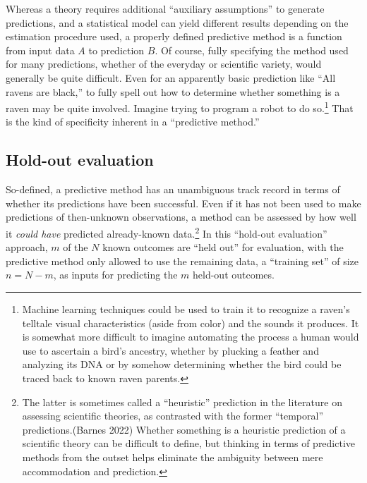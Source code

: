 \documentclass[
  letterpaper,
  DIV=11,
  numbers=noendperiod]{scrartcl}
\theoremstyle{definition}
\theoremstyle{remark}
\begin{document}
Whereas a theory requires additional ``auxiliary assumptions'' to
generate predictions, and a statistical model can yield different
results depending on the estimation procedure used, a properly defined
predictive method is a function from input data \(A\) to prediction
\(B\). Of course, fully specifying the method used for many predictions,
whether of the everyday or scientific variety, would generally be quite
difficult. Even for an apparently basic prediction like ``All ravens are
black,'' to fully spell out how to determine whether something is a
raven may be quite involved. Imagine trying to program a robot to do
so.\footnote{Machine learning techniques could be used to train it to
  recognize a raven's telltale visual characteristics (aside from color)
  and the sounds it produces. It is somewhat more difficult to imagine
  automating the process a human would use to ascertain a bird's
  ancestry, whether by plucking a feather and analyzing its DNA or by
  somehow determining whether the bird could be traced back to known
  raven parents.} That is the kind of specificity inherent in a
``predictive method.''

\subsection{Hold-out evaluation}\label{hold-out-evaluation}

So-defined, a predictive method has an unambiguous track record in terms
of whether its predictions have been successful. Even if it has not been
used to make predictions of then-unknown observations, a method can be
assessed by how well it \emph{could have} predicted already-known
data.\footnote{The latter is sometimes called a ``heuristic'' prediction
  in the literature on assessing scientific theories, as contrasted with
  the former ``temporal'' predictions.(Barnes 2022) Whether something is
  a heuristic prediction of a scientific theory can be difficult to
  define, but thinking in terms of predictive methods from the outset
  helps eliminate the ambiguity between mere accommodation and
  prediction.} In this ``hold-out evaluation'' approach, \(m\) of the
\(N\) known outcomes are ``held out'' for evaluation, with the
predictive method only allowed to use the remaining data, a ``training
set'' of size \(n=N-m\), as inputs for predicting the \(m\) held-out
outcomes.
\end{document}
